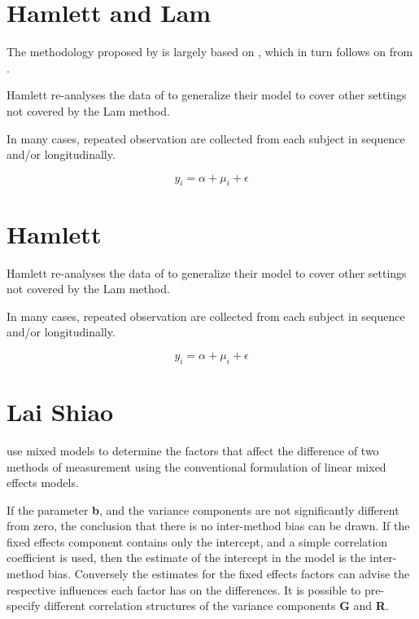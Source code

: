 \documentclass[12pt, a4paper]{report}
\theoremstyle{plain}
\theoremstyle{definition}
\theoremstyle{remark}
\begin{document}
\section{Hamlett and Lam}
The methodology proposed by \citet{Roy2009} is largely based on \citet{hamlett}, which in turn follows on from \citet{lam}.



Hamlett re-analyses the data of \citet{lam} to generalize their model to cover other settings not covered by the Lam method.

In many cases, repeated observation are collected from each subject in sequence  and/or longitudinally.


\[ y_i = \alpha + \mu_i + \epsilon \]





\section{Hamlett}
Hamlett re-analyses the data of \citet{lam} to generalize their model to cover other settings not covered by the Lam method.

In many cases, repeated observation are collected from each subject in sequence  and/or longitudinally.


\[ y_i = \alpha + \mu_i + \epsilon \]

		\section{Lai Shiao}
		\citet{LaiShiao} use mixed models to determine the factors that
		affect the difference of two methods of measurement using the
		conventional formulation of linear mixed effects models.
		
		If the parameter \textbf{b}, and the variance components are not
		significantly different from zero, the conclusion that there is no
		inter-method bias can be drawn. If the fixed effects component
		contains only the intercept, and a simple correlation coefficient
		is used, then the estimate of the intercept in the model is the
		inter-method bias. Conversely the estimates for the fixed effects
		factors can advise the respective influences each factor has on
		the differences. It is possible to pre-specify different
		correlation structures of the variance components \textbf{G} and
		\textbf{R}.
		
\end{document}
